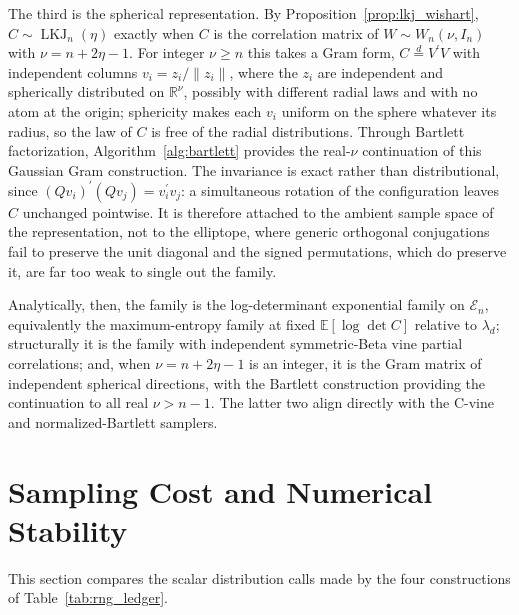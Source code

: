 \documentclass[12pt,english]{article}
\theoremstyle{plain} %
\theoremstyle{definition} %
\theoremstyle{remark} %
\begin{document}
The third is the spherical representation. By Proposition~\ref{prop:lkj_wishart}, $C\sim\operatorname{LKJ}_n(\eta)$ exactly when $C$ is the correlation matrix of $W\sim W_n(\nu,I_n)$ with $\nu=n+2\eta-1$. For integer $\nu\geq n$ this takes a Gram form, $C\overset{d}{=}V^\prime V$ with independent columns $v_i=z_i/\|z_i\|$, where the $z_i$ are independent and spherically distributed on $\mathbb{R}^\nu$, possibly with different radial laws and with no atom at the origin; sphericity makes each $v_i$ uniform on the sphere whatever its radius, so the law of $C$ is free of the radial distributions. Through Bartlett factorization, Algorithm~\ref{alg:bartlett} provides the real-$\nu$ continuation of this Gaussian Gram construction. The invariance is exact rather than distributional, since $(Qv_i)^\prime(Qv_j)=v_i^\prime v_j$: a simultaneous rotation of the configuration leaves $C$ unchanged pointwise. It is therefore attached to the ambient sample space of the representation, not to the elliptope, where generic orthogonal conjugations fail to preserve the unit diagonal and the signed permutations, which do preserve it, are far too weak to single out the family.

Analytically, then, the family is the log-determinant exponential family on $\mathcal{E}_n$, equivalently the maximum-entropy family at fixed $\mathbb{E}[\log\det C]$ relative to $\lambda_d$; structurally it is the family with independent symmetric-Beta vine partial correlations; and, when $\nu=n+2\eta-1$ is an integer, it is the Gram matrix of independent spherical directions, with the Bartlett construction providing the continuation to all real $\nu>n-1$. The latter two align directly with the C-vine and normalized-Bartlett samplers.

\section{Sampling Cost and Numerical Stability}
\label{sec:ledger}

This section compares the scalar distribution calls made by the four constructions of Table~\ref{tab:rng_ledger}.
\end{document}
